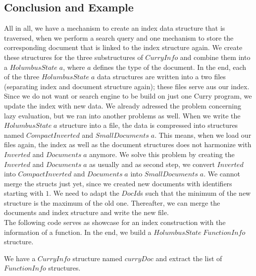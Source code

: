 \documentclass[%
	latex,%
	a4paper,%
	oneside,%
	chapterprefix,%
	headsepline,%
	12pt%
]{scrbook}
\newcommand{\Conid}[1]{\mathit{#1}}
\newcommand{\Varid}[1]{\mathit{#1}}
\begin{document}
\subsection{Conclusion and Example}
All in all, we have a mechanism to create an index data structure that
is traversed, when we perform a search query and one mechanism to
store the corresponding document that is linked to the index
structure again. %
We create these structures for the three substructures of \ensuremath{\Conid{CurryInfo}}
and combine them into a \ensuremath{\Conid{HolumbusState}\;\Varid{a}}, where \ensuremath{\Varid{a}} defines the type
of the document. %
In the end, each of the three \ensuremath{\Conid{HolumbusState}\;\Varid{a}} data structures are
written into a two files (separating index and document structure
again); these files serve aus our index. \\

Since we do not want or search engine to be build on just one Curry
program, we update the index with new data. %
We already adressed the problem concerning lazy evaluation, but we ran
into another problems as well. %
When we write the \ensuremath{\Conid{HolumbusState}\;\Varid{a}} structure into a file, the data is
compressed into structures named \ensuremath{\Conid{CompactInverted}} and \ensuremath{\Conid{SmallDocuments}\;\Varid{a}}. %
This means, when we load our files again, the index as well as the
document structures does not harmonize with \ensuremath{\Conid{Inverted}} and \ensuremath{\Conid{Documents}\;\Varid{a}} anymore. %
We solve this problem by creating the \ensuremath{\Conid{Inverted}} and \ensuremath{\Conid{Documents}\;\Varid{a}} as
usually and as second step, we convert \ensuremath{\Conid{Inverted}} into
\ensuremath{\Conid{CompactInverted}} and \ensuremath{\Conid{Documents}\;\Varid{a}} into \ensuremath{\Conid{SmallDocuments}\;\Varid{a}}. %
We cannot merge the structs just yet, since we created new documents
with identifiers starting with \ensuremath{\mathrm{1}}. %
We need to adapt the \ensuremath{\Conid{DocId}}s such that the minimum of the new
structure is the maximum of the old one. %
Thereafter, we can merge the documents and index structure and write
the new file. \\

The following code serves as showcase for an index construction with
the information of a function. %
In the end, we build a \ensuremath{\Conid{HolumbusState}\;\Conid{FunctionInfo}} structure. %

We have a \ensuremath{\Conid{CurryInfo}} structure named \ensuremath{\Varid{curryDoc}} and extract the list
of \ensuremath{\Conid{FunctionInfo}} structures. %
\end{document}
